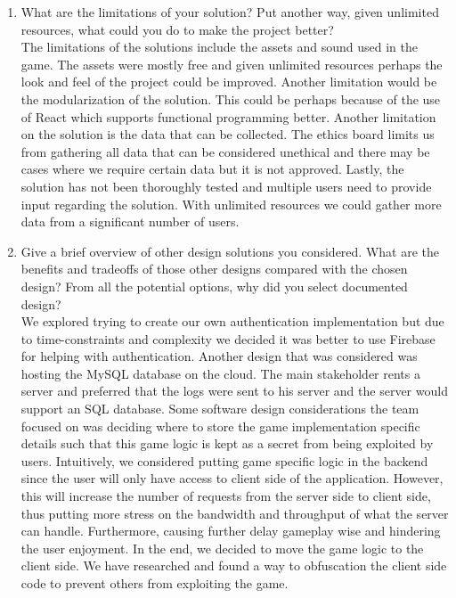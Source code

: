 \documentclass[12pt, titlepage]{article}
\begin{document}
\begin{enumerate}
  \item What are the limitations of your solution?  Put another way, given
  unlimited resources, what could you do to make the project better? \\
  
  \smallskip
  The limitations of the solutions include the assets and sound used in the game. The assets were mostly free and given unlimited resources perhaps the look and feel of the project could be improved. Another limitation would be the modularization of the solution. This could be perhaps because of the use of React which supports functional programming better. Another limitation on the solution is the data that can be collected. The ethics board limits us from gathering all data that can be considered unethical and there may be cases where we require certain data but it is not approved. Lastly, the solution has not been thoroughly tested and multiple users need to provide input regarding the solution. With unlimited resources we could gather  more data from a significant number of users.
  \item Give a brief overview of other design solutions you considered.  What
  are the benefits and tradeoffs of those other designs compared with the chosen
  design?  From all the potential options, why did you select documented design?\\
  
  \medskip
  We explored trying to create our own authentication implementation but due to time-constraints and complexity we decided it was better to use Firebase for helping with authentication. Another design that was considered was hosting the MySQL database on the cloud. The main stakeholder rents a server and preferred that the logs were sent to his server and the server would support an SQL database. Some software design considerations the team focused on was deciding where to store the game implementation specific details such that this game logic is kept as a secret from being exploited by users. Intuitively, we considered putting game specific logic in the backend since the user will only have access to client side of the application. However, this will increase the number of requests from the server side to client side, thus putting more stress on the bandwidth and throughput of what the server can handle. Furthermore, causing further delay gameplay wise and hindering the user enjoyment. In the end, we decided to move the game logic to the client side. We have researched and found a way to obfuscation the client side code to prevent others from exploiting the game. 
\\
  
\end{enumerate}
\end{document}
